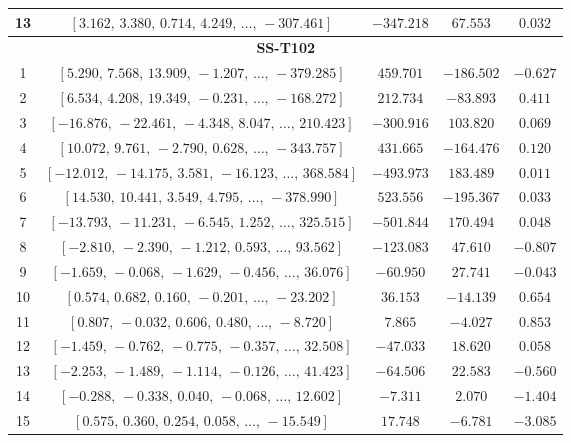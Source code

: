 \begin{table}[H]
\begin{tabular}{c c c c c}
13 &
$[3.162,\,3.380,\,0.714,\,4.249,\,\dots,\,-307.461]$
& $-347.218$
& $67.553$
& $0.032$
\\

\midrule
\multicolumn{5}{c}{\textbf{SS-T102}} \\
\midrule

1 &
$[5.290,\,7.568,\,13.909,\,-1.207,\,\dots,\,-379.285]$
& $459.701$
& $-186.502$
& $-0.627$
\\

2 &
$[6.534,\,4.208,\,19.349,\,-0.231,\,\dots,\,-168.272]$
& $212.734$
& $-83.893$
& $0.411$
\\

3 &
$[-16.876,\,-22.461,\,-4.348,\,8.047,\,\dots,\,210.423]$
& $-300.916$
& $103.820$
& $0.069$
\\

4 &
$[10.072,\,9.761,\,-2.790,\,0.628,\,\dots,\,-343.757]$
& $431.665$
& $-164.476$
& $0.120$
\\

5 &
$[-12.012,\,-14.175,\,3.581,\,-16.123,\,\dots,\,368.584]$
& $-493.973$
& $183.489$
& $0.011$
\\

6 &
$[14.530,\,10.441,\,3.549,\,4.795,\,\dots,\,-378.990]$
& $523.556$
& $-195.367$
& $0.033$
\\

7 &
$[-13.793,\,-11.231,\,-6.545,\,1.252,\,\dots,\,325.515]$
& $-501.844$
& $170.494$
& $0.048$
\\

8 &
$[-2.810,\,-2.390,\,-1.212,\,0.593,\,\dots,\,93.562]$
& $-123.083$
& $47.610$
& $-0.807$
\\

9 &
$[-1.659,\,-0.068,\,-1.629,\,-0.456,\,\dots,\,36.076]$
& $-60.950$
& $27.741$
& $-0.043$
\\

10 &
$[0.574,\,0.682,\,0.160,\,-0.201,\,\dots,\,-23.202]$
& $36.153$
& $-14.139$
& $0.654$
\\

11 &
$[0.807,\,-0.032,\,0.606,\,0.480,\,\dots,\,-8.720]$
& $7.865$
& $-4.027$
& $0.853$
\\

12 &
$[-1.459,\,-0.762,\,-0.775,\,-0.357,\,\dots,\,32.508]$
& $-47.033$
& $18.620$
& $0.058$
\\

13 &
$[-2.253,\,-1.489,\,-1.114,\,-0.126,\,\dots,\,41.423]$
& $-64.506$
& $22.583$
& $-0.560$
\\

14 &
$[-0.288,\,-0.338,\,0.040,\,-0.068,\,\dots,\,12.602]$
& $-7.311$
& $2.070$
& $-1.404$
\\

15 &
$[0.575,\,0.360,\,0.254,\,0.058,\,\dots,\,-15.549]$
& $17.748$
& $-6.781$
& $-3.085$
\\

\bottomrule
\end{tabular}
\end{table}

